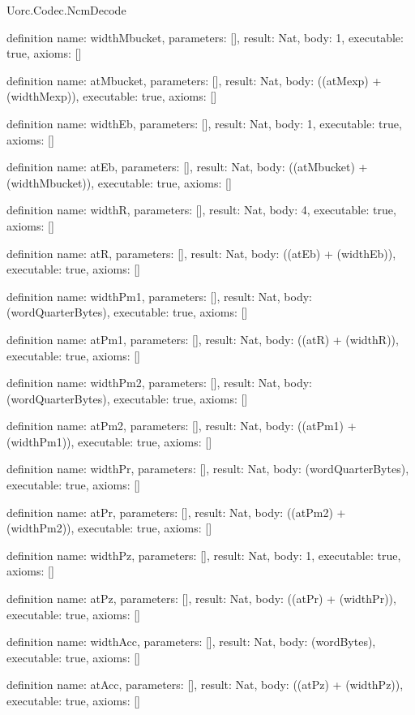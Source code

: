 \begin{lexlean}{Uorc.Codec.NcmDecode}
\begin{semanticmodule}
definition{
  name: widthMbucket,
  parameters: [],
  result: Nat,
  body: 1,
  executable: true,
  axioms: []
}

definition{
  name: atMbucket,
  parameters: [],
  result: Nat,
  body: ((atMexp) + (widthMexp)),
  executable: true,
  axioms: []
}

definition{
  name: widthEb,
  parameters: [],
  result: Nat,
  body: 1,
  executable: true,
  axioms: []
}

definition{
  name: atEb,
  parameters: [],
  result: Nat,
  body: ((atMbucket) + (widthMbucket)),
  executable: true,
  axioms: []
}

definition{
  name: widthR,
  parameters: [],
  result: Nat,
  body: 4,
  executable: true,
  axioms: []
}

definition{
  name: atR,
  parameters: [],
  result: Nat,
  body: ((atEb) + (widthEb)),
  executable: true,
  axioms: []
}

definition{
  name: widthPm1,
  parameters: [],
  result: Nat,
  body: (wordQuarterBytes),
  executable: true,
  axioms: []
}

definition{
  name: atPm1,
  parameters: [],
  result: Nat,
  body: ((atR) + (widthR)),
  executable: true,
  axioms: []
}

definition{
  name: widthPm2,
  parameters: [],
  result: Nat,
  body: (wordQuarterBytes),
  executable: true,
  axioms: []
}

definition{
  name: atPm2,
  parameters: [],
  result: Nat,
  body: ((atPm1) + (widthPm1)),
  executable: true,
  axioms: []
}

definition{
  name: widthPr,
  parameters: [],
  result: Nat,
  body: (wordQuarterBytes),
  executable: true,
  axioms: []
}

definition{
  name: atPr,
  parameters: [],
  result: Nat,
  body: ((atPm2) + (widthPm2)),
  executable: true,
  axioms: []
}

definition{
  name: widthPz,
  parameters: [],
  result: Nat,
  body: 1,
  executable: true,
  axioms: []
}

definition{
  name: atPz,
  parameters: [],
  result: Nat,
  body: ((atPr) + (widthPr)),
  executable: true,
  axioms: []
}

definition{
  name: widthAcc,
  parameters: [],
  result: Nat,
  body: (wordBytes),
  executable: true,
  axioms: []
}

definition{
  name: atAcc,
  parameters: [],
  result: Nat,
  body: ((atPz) + (widthPz)),
  executable: true,
  axioms: []
}


\end{semanticmodule}
\end{lexlean}
